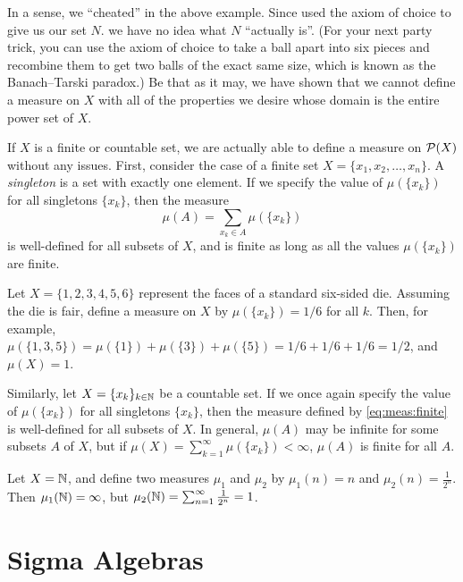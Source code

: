 \documentclass[main.tex]{subfiles}
\begin{document}
In a sense, we ``cheated'' in the above example. Since used the axiom of choice to give us our set $N$. we have no idea what $N$ ``actually is''. (For your next party trick, you can use the axiom of choice to take a ball apart into six pieces and recombine them to get two balls of the exact same size, which is known as the Banach–Tarski paradox.) Be that as it may, we have shown that we cannot define a measure on $X$ with all of the properties we desire whose domain is the entire power set of $X$. 

If $X$ is a finite or countable set, we are actually able to define a measure on ${\mathcal P}(X)$ without any issues. First, consider the case of a finite set $X = \{ x_1, x_2, \dots, x_n \}$. A \emph{singleton} is a set with exactly one element. If we specify the value of $\mu\left(\{ x_k \}\right)$ for all singletons $\{ x_k \}$, then the measure
\begin{equation}\label{eq:meas:finite}
\mu(A) = \sum_{x_k \in A} \mu\left(\{ x_k \}\right)
\end{equation}
is well-defined for all subsets of $X$, and is finite as long as all the values $\mu\left(\{ x_k \}\right)$ are finite.

\begin{example}Let $X = \{ 1, 2, 3, 4, 5, 6\}$ represent the faces of a standard six-sided die. Assuming the die is fair, define a measure on $X$ by $\mu\left(\{ x_k \}\right) = 1/6$ for all $k$. Then, for example, $\mu(\{1,3,5\}) = \mu(\{1\})+\mu(\{3\})+\mu(\{5\}) = 1/6+1/6+1/6 = 1/2$, and $\mu(X) = 1$.
\end{example}

Similarly, let $X = \{ x_k\}_{k \in {\mathbb N}}$ be a countable set. If we once again specify the value of $\mu\left(\{ x_k \}\right)$ for all singletons $\{ x_k \}$, then the measure defined by \cref{eq:meas:finite} is well-defined for all subsets of $X$. In general, $\mu(A)$ may be infinite for some subsets $A$ of $X$, but if $\mu(X) = \sum_{k=1}^\infty \mu\left(\{ x_k\}\right) < \infty$, $\mu(A)$ is finite for all $A$.

\begin{example}Let $X = {\mathbb N}$, and define two measures $\mu_1$ and $\mu_2$ by $\mu_1(n) = n$ and $\mu_2(n) = \frac{1}{2^n}$. Then $\mu_1({\mathbb N}) = \infty$, but $\mu_2({\mathbb N}) = \sum_{n=1}^\infty \frac{1}{2^n} = 1$.
\end{example}

\section{Sigma Algebras}
\end{document}
